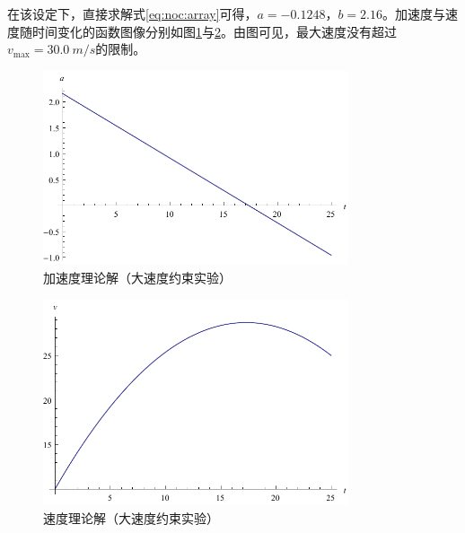 在该设定下，直接求解式\eqref{eq:noc:array}可得，$a=-0.1248$，$b=2.16$。加速度与速度随时间变化的函数图像分别如图\ref{fig:da}与\ref{fig:dv}。由图可见，最大速度没有超过$v_{\max}=\SI{30.0}{m\per s}$的限制。
\begin{figure}[htbp]
\centering
\includegraphics[width=9cm]{figures/vopt/da.pdf}
\caption{加速度理论解（大速度约束实验）}
\label{fig:da}
\end{figure}
\begin{figure}[htbp]
\centering
\includegraphics[width=9cm]{figures/vopt/dv.pdf}
\caption{速度理论解（大速度约束实验）}
\label{fig:dv}
\end{figure}


